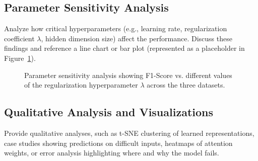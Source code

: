 \subsection{Parameter Sensitivity Analysis}
Analyze how critical hyperparameters (e.g., learning rate, regularization coefficient $\lambda$, hidden dimension size) affect the performance. Discuss these findings and reference a line chart or bar plot (represented as a placeholder in Figure~\ref{fig:sensitivity}).

\begin{figure}[h]
\centering
\fbox{\rule{0pt}{1.8in} \rule{0.8\linewidth}{0pt}} %
\caption{Parameter sensitivity analysis showing F1-Score vs. different values of the regularization hyperparameter $\lambda$ across the three datasets.}\label{fig:sensitivity}
\end{figure}

\subsection{Qualitative Analysis and Visualizations}
Provide qualitative analyses, such as t-SNE clustering of learned representations, case studies showing predictions on difficult inputs, heatmaps of attention weights, or error analysis highlighting where and why the model fails.
